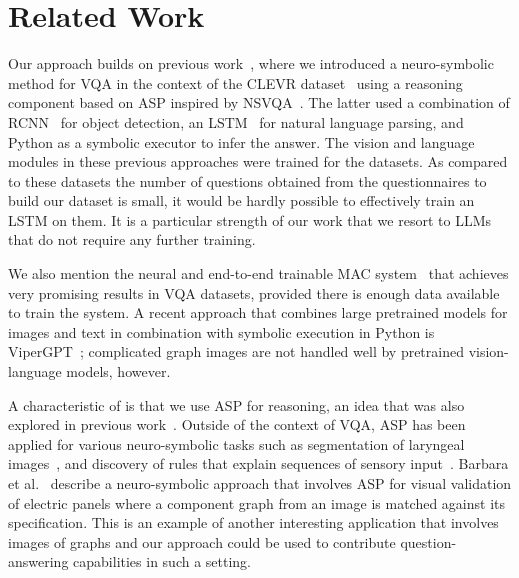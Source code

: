 \section{Related Work}
\label{sec:rel}

Our approach 
builds on previous work~\cite{eiterHOP22}, where we introduced a %
neuro-symbolic method for VQA in the context of the CLEVR dataset~\cite{johnson2017clevr}
using a reasoning component based on ASP inspired by NSVQA~\cite{yi2018nsvqa}. The latter used a combination of RCNN~\cite{ren2015rcnn} for object detection, an LSTM~\cite{hochreiter1997lstm} for natural language parsing, and Python as a symbolic executor to infer the answer. 
The vision and language modules in these previous approaches were trained for the datasets. 
As compared to these datasets the number of questions obtained from the questionnaires to build our dataset is small, it would be hardly possible to effectively train an %
LSTM on them. 
It is a particular strength of our work that we resort to LLMs that do not require any further training.

We also mention the neural and end-to-end trainable MAC system~\cite{hudson2018mac} that achieves very promising results in VQA datasets, provided there is enough data available to train the system.
A recent approach that combines large pretrained models for images and text in combination with symbolic execution in Python is ViperGPT~\cite{vipergpt}; complicated graph images
are not handled well by pretrained vision-language models, however.

A characteristic of \ours is that we use ASP for reasoning, an
idea that was also explored in previous work~\cite{RileyS19,BasuSG20,eiterHOP22,EiterGHO23}.
Outside of the context of VQA, ASP has been applied for various neuro-symbolic tasks such as
segmentation of laryngeal images~\cite{brunoCMM21}, and discovery of rules that explain sequences of sensory input~\cite{evansHWKS21}. 
Barbara et al.~\cite{BarbaraGLMQRR23} describe a neuro-symbolic approach that involves ASP for visual validation of electric panels where a component graph from an image is matched against its specification. This is an example of another interesting application that involves images of graphs and our approach could be used to contribute question-answering capabilities in such a setting.

